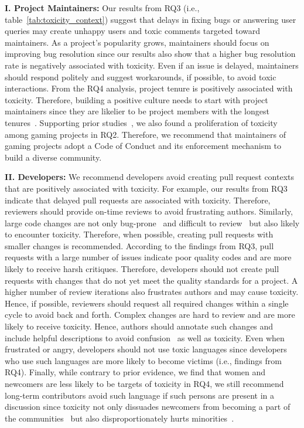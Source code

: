 \vspace{4pt}
\noindent \textbf{ I. Project Maintainers:}  
Our results from RQ3 (i.e., table~\ref{tab:toxicity_context}) suggest that delays in fixing bugs or answering user queries may create unhappy users and toxic comments targeted toward maintainers.
As a project's popularity grows, maintainers should focus on improving bug resolution since our results also show that a higher bug resolution rate is negatively associated with toxicity. Even if an issue is delayed, maintainers should respond politely and suggest workarounds, if possible, to avoid toxic interactions.
From the RQ4 analysis, project tenure is positively associated with toxicity. Therefore, building a positive culture needs to start with project maintainers since they are likelier to be project members with the longest tenures~\cite{toxic-blog-linux3}. 
Supporting prior studies~\cite{miller2022did,belskie2023measuring,paul2018toxic,beres2021don}, we also found a proliferation of toxicity among gaming projects in RQ2. Therefore,  we recommend that maintainers of gaming projects adopt a Code of Conduct and its enforcement mechanism to build a diverse community. 




\vspace{4pt}
\noindent\textbf{II. Developers:}   We recommend developers avoid creating pull request contexts that are positively associated with toxicity.  For example, our results from RQ3 indicate that delayed pull requests are associated with toxicity. Therefore, reviewers should provide on-time reviews to avoid frustrating authors.
Similarly, large code changes are not only bug-prone~\cite{bosu2015characteristics} and difficult to review~\cite{thongtanunam2017review} but also likely to encounter toxicity. Therefore, when possible, creating pull requests with smaller changes is recommended. According to the findings from RQ3, pull requests with a large number of issues indicate poor quality codes and are more likely to receive harsh critiques. Therefore, developers should not create pull requests with changes that do not yet meet the quality standards for a project. A higher number of review iterations also frustrates authors and may cause toxicity. Hence, if possible, reviewers should request all required changes within a single cycle to avoid back and forth.
Complex changes are hard to review and are more likely to receive toxicity. Hence, authors should annotate such changes and include helpful descriptions to avoid confusion~\cite{ebert2019confusion} as well as toxicity.
 Even when frustrated or angry, developers should not use toxic languages since developers who use such languages are more likely to become victims (i.e., findings from RQ4). 
Finally, while contrary to prior evidence, we find that women and newcomers are less likely to be targets of toxicity in RQ4, we still recommend long-term contributors avoid such language if such persons are present in a discussion since toxicity not only dissuades newcomers from becoming a part of the communities~\cite{steinmacher2015social} but also disproportionately hurts minorities~\cite{gunawardena2022destructive}.

